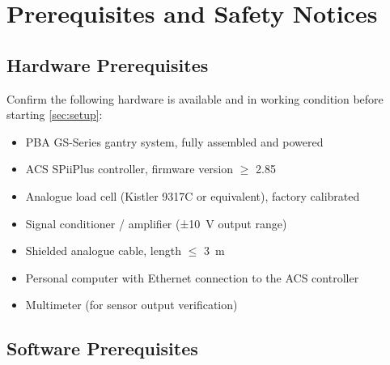 
\section{Prerequisites and Safety Notices}
\label{sec:safety}


\subsection{Hardware Prerequisites}
\label{sec:safety:hardware}

Confirm the following hardware is available and in working condition before
starting \cref{sec:setup}:

\begin{itemize}[noitemsep, topsep=4pt]
  \item[$\square$] PBA GS-Series gantry system, fully assembled and powered
  \item[$\square$] ACS SPiiPlus controller, firmware version $\geq$ 2.85
  \item[$\square$] Analogue load cell (Kistler 9317C or equivalent), factory
                   calibrated
  \item[$\square$] Signal conditioner / amplifier (±\SI{10}{\volt} output range)
  \item[$\square$] Shielded analogue cable, length $\leq$ \SI{3}{\metre}
  \item[$\square$] Personal computer with Ethernet connection to the ACS
                   controller
  \item[$\square$] Multimeter (for sensor output verification)
\end{itemize}


\subsection{Software Prerequisites}
\label{sec:safety:software}

